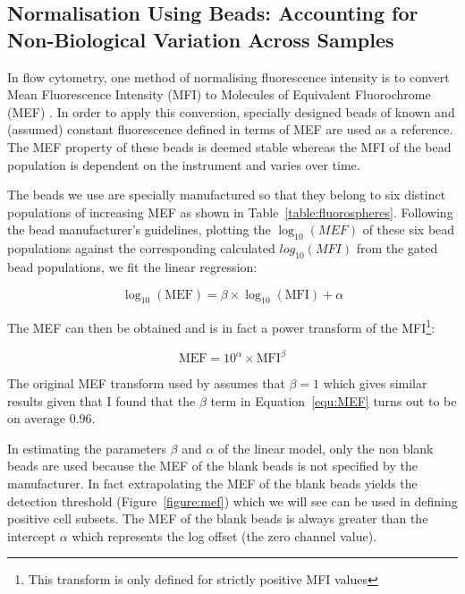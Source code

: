 \subsection{Normalisation Using Beads: Accounting for Non-Biological Variation Across Samples}


In flow cytometry, one method of normalising fluorescence intensity is to convert Mean Fluorescence Intensity (MFI)
to Molecules of Equivalent Fluorochrome (MEF) \citep{Schwartz:1996jj,Dendrou:2009bl}.
In order to apply this conversion, specially designed beads of known and (assumed) constant fluorescence defined in terms of MEF are used as a reference.
The MEF property of these beads is deemed stable whereas the MFI of the bead population is dependent on the instrument and varies over time.

The beads we use are specially manufactured so that they belong to six distinct populations of increasing MEF as shown in Table~\ref{table:fluorospheres}.
Following the bead manufacturer's guidelines, plotting the $\log_{10}(MEF)$ of these six bead populations against
the corresponding calculated $log_{10}(MFI)$ from the gated bead populations, we fit the linear regression:


\begin{equation}
    \log_{10}(\text{MEF})=\beta  \times \log_{10}(\text{MFI}) + \alpha
\label{equ:MEF}
\end{equation}

The MEF can then be obtained and is in fact a power transform of the MFI\footnote{This transform is only defined for strictly positive MFI values}:


\[
    \text{MEF}= 10^\alpha \times \text{MFI}^\beta
\]



The original MEF transform used by \citet{Dendrou:2009bl} assumes that $\beta=1$ which
gives similar results given that I found that the $\beta$ term in Equation~\ref{equ:MEF} turns out to be on average $0.96$.


In estimating the parameters $\beta$ and $\alpha$ of the linear model, only the non blank beads are used because the MEF of the blank beads is not specified by the manufacturer.
In fact extrapolating the MEF of the blank beads yields the detection threshold (Figure~\ref{figure:mef}) which we will see can be used in defining positive cell subsets.
The MEF of the blank beads is always greater than the intercept $\alpha$  which represents the log offset (the zero channel value).

